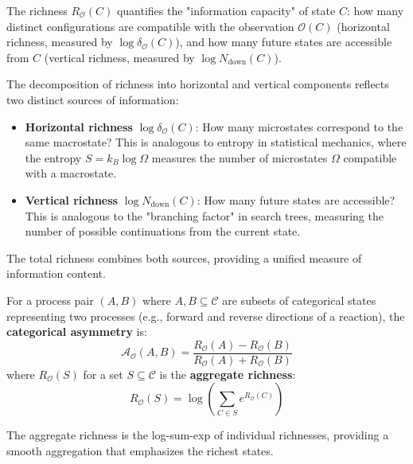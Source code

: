 The richness $R_{\mathcal{O}}(C)$ quantifies the "information capacity" of state $C$: how many distinct configurations are compatible with the observation $\mathcal{O}(C)$ (horizontal richness, measured by $\log \delta_{\mathcal{O}}(C)$), and how many future states are accessible from $C$ (vertical richness, measured by $\log N_{\text{down}}(C)$).

\begin{remark}
\label{rem:horizontal_vertical}
The decomposition of richness into horizontal and vertical components reflects two distinct sources of information:
\begin{itemize}
    \item \textbf{Horizontal richness} $\log \delta_{\mathcal{O}}(C)$: How many microstates correspond to the same macrostate? This is analogous to entropy in statistical mechanics, where the entropy $S = k_B \log \Omega$ measures the number of microstates $\Omega$ compatible with a macrostate.
    
    \item \textbf{Vertical richness} $\log N_{\text{down}}(C)$: How many future states are accessible? This is analogous to the "branching factor" in search trees, measuring the number of possible continuations from the current state.
\end{itemize}

The total richness combines both sources, providing a unified measure of information content.
\end{remark}

\begin{definition}
\label{def:asymmetry_formal}
For a process pair $(A, B)$ where $A, B \subseteq \mathcal{C}$ are subsets of categorical states representing two processes (e.g., forward and reverse directions of a reaction), the \textbf{categorical asymmetry} is:
\begin{equation}
\mathcal{A}_{\mathcal{O}}(A, B) = \frac{R_{\mathcal{O}}(A) - R_{\mathcal{O}}(B)}{R_{\mathcal{O}}(A) + R_{\mathcal{O}}(B)}
\label{eq:asymmetry}
\end{equation}
where $R_{\mathcal{O}}(S)$ for a set $S \subseteq \mathcal{C}$ is the \textbf{aggregate richness}:
\begin{equation}
R_{\mathcal{O}}(S) = \log \left( \sum_{C \in S} e^{R_{\mathcal{O}}(C)} \right)
\label{eq:aggregate_richness}
\end{equation}

The aggregate richness is the log-sum-exp of individual richnesses, providing a smooth aggregation that emphasizes the richest states.
\end{definition}

